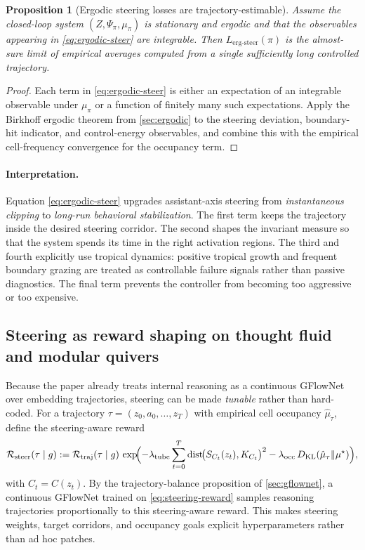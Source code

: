 \documentclass[11pt]{article}
\theoremstyle{definition}
\theoremstyle{plain}
\newtheorem{proposition}{Proposition}[section]
\theoremstyle{remark}
\newcommand{\mc}[1]{\mathcal{#1}}
\newcommand{\Reward}{\mc{R}}
\begin{document}
\begin{proposition}[Ergodic steering losses are trajectory-estimable]
\label{prop:ergodic-steering-estimable}
Assume the closed-loop system $(Z,\Psi_\pi,\mu_\pi)$ is stationary and ergodic and that the observables appearing in \eqref{eq:ergodic-steer} are integrable.
Then $L_{\mathrm{erg\text{-}steer}}(\pi)$ is the almost-sure limit of empirical averages computed from a single sufficiently long controlled trajectory.
\end{proposition}

\begin{proof}
Each term in \eqref{eq:ergodic-steer} is either an expectation of an integrable observable under $\mu_\pi$ or a function of finitely many such expectations.
Apply the Birkhoff ergodic theorem from \cref{sec:ergodic} to the steering deviation, boundary-hit indicator, and control-energy observables, and combine this with the empirical cell-frequency convergence for the occupancy term.
\end{proof}

\paragraph{Interpretation.}
Equation \eqref{eq:ergodic-steer} upgrades assistant-axis steering from \emph{instantaneous clipping} to \emph{long-run behavioral stabilization}.
The first term keeps the trajectory inside the desired steering corridor.
The second shapes the invariant measure so that the system spends its time in the right activation regions.
The third and fourth explicitly use tropical dynamics:
positive tropical growth and frequent boundary grazing are treated as controllable failure signals rather than passive diagnostics.
The final term prevents the controller from becoming too aggressive or too expensive.

\subsection{Steering as reward shaping on thought fluid and modular quivers}
\label{sec:steering-gflownet}

Because the paper already treats internal reasoning as a continuous GFlowNet over embedding trajectories, steering can be made \emph{tunable} rather than hard-coded.
For a trajectory $\tau=(z_0,a_0,\dots,z_T)$ with empirical cell occupancy $\hat\mu_\tau$, define the steering-aware reward
\begin{equation}
\Reward_{\mathrm{steer}}(\tau\mid g)
:=
\Reward_{\mathrm{traj}}(\tau\mid g)\,
\exp\!\Bigl(
-\lambda_{\mathrm{tube}}\sum_{t=0}^{T}\mathrm{dist}\!\bigl(S_{C_t}(z_t),K_{C_t}\bigr)^2
-\lambda_{\mathrm{occ}}\,D_{\mathrm{KL}}(\hat\mu_\tau\|\mu^\star)
\Bigr),
\label{eq:steering-reward}
\end{equation}
with $C_t=C(z_t)$.
By the trajectory-balance proposition of \cref{sec:gflownet}, a continuous GFlowNet trained on \eqref{eq:steering-reward} samples reasoning trajectories proportionally to this steering-aware reward.
This makes steering weights, target corridors, and occupancy goals explicit hyperparameters rather than ad hoc patches.
\end{document}
